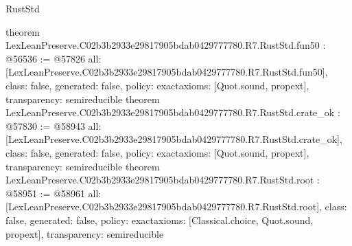 \begin{lexlean}{RustStd}
\begin{coremodule}
{}
theorem LexLeanPreserve.C02b3b2933e29817905bdab0429777780.R7.RustStd.fun50 : @56536 := @57826 {
  all: [LexLeanPreserve.C02b3b2933e29817905bdab0429777780.R7.RustStd.fun50],
  class: false,
  generated: false,
  policy: exact{axioms: [Quot.sound, propext]},
  transparency: semireducible
}
theorem LexLeanPreserve.C02b3b2933e29817905bdab0429777780.R7.RustStd.crate_ok : @57830 := @58943 {
  all: [LexLeanPreserve.C02b3b2933e29817905bdab0429777780.R7.RustStd.crate_ok],
  class: false,
  generated: false,
  policy: exact{axioms: [Quot.sound, propext]},
  transparency: semireducible
}
theorem LexLeanPreserve.C02b3b2933e29817905bdab0429777780.R7.RustStd.root : @58951 := @58961 {
  all: [LexLeanPreserve.C02b3b2933e29817905bdab0429777780.R7.RustStd.root],
  class: false,
  generated: false,
  policy: exact{axioms: [Classical.choice, Quot.sound, propext]},
  transparency: semireducible
}


\end{coremodule}
\end{lexlean}
